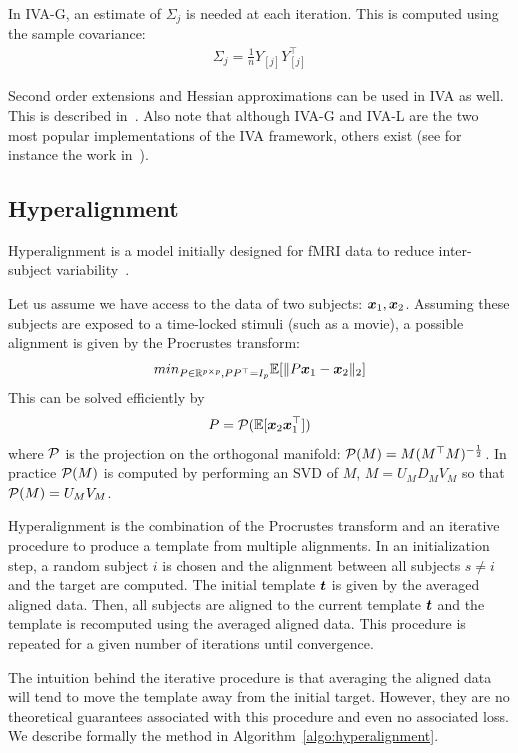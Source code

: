 In IVA-G, an estimate of $\Sigma_j$ is needed at each iteration. This is
computed using the sample covariance:
\begin{align}
\Sigma_j = \frac1{n} Y_{[j]} Y_{[j]}^{\top}
\end{align}

Second order extensions and Hessian approximations can be used in IVA as well.
This is described in~\cite{anderson2011joint}. Also note that although IVA-G and
IVA-L are the two most popular implementations of the IVA framework, others exist
(see for instance the work in~\cite{anderson2013independent}).

\subsection{Hyperalignment}
Hyperalignment is a model initially designed for fMRI data to reduce
inter-subject variability~\cite{haxby2011common}.

Let us assume we have access to the data of two subjects: $\boldsymbol{x}_1, \boldsymbol{x}_2$.
Assuming these subjects are exposed to a time-locked stimuli (such as a movie), a possible alignment is given by the Procrustes transform:
\begin{align}
min_{P \in \mathbb{R}^{p \times p}, PP^{\top} = I_p} \mathbb{E}[\|P \boldsymbol{x}_1 - \boldsymbol{x}_2 \|_2]
\end{align}
This can be solved efficiently by
\begin{align}
  P = \mathcal{P}(\mathbb{E}[\boldsymbol{x}_2 \boldsymbol{x}_1^{\top}])
\end{align}
where $\mathcal{P}$ is the projection on the orthogonal manifold: $\mathcal{P}(M) = M
(M^{\top}M)^{-\frac12}$. In practice $\mathcal{P}(M)$ is computed by performing an SVD
of $M$, $M = U_M D_M V_M $ so that $\mathcal{P}(M) = U_M V_M$.

Hyperalignment is the combination of the Procrustes transform and an iterative
procedure to produce a template from multiple alignments.
In an initialization step, a random subject $i$ is chosen and the alignment
between all subjects $s \neq i$ and the target are computed. The initial
template $\boldsymbol{t}$ is given by the averaged aligned data. Then, all subjects are
aligned to the current template $\boldsymbol{t}$ and the template is recomputed using the
averaged aligned data. This procedure is repeated for a given number of
iterations until convergence.

The intuition behind the iterative procedure is that averaging the aligned data
will tend to move the template away from the initial target. However, they are
no theoretical guarantees associated with this procedure and even no associated loss.
We describe formally
the method in Algorithm~\ref{algo:hyperalignment}.

